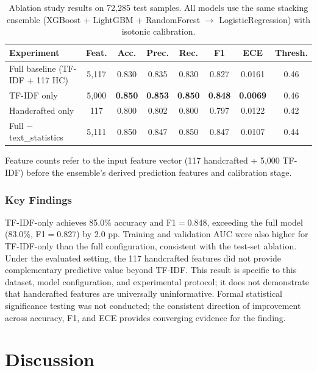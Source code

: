 \documentclass[12pt,a4paper]{article}
\begin{document}
\begin{table}[H]
\centering
\caption{Ablation study results on 72,285 test samples. All models use the same stacking ensemble (XGBoost + LightGBM + RandomForest $\to$ LogisticRegression) with isotonic calibration.}
\label{tab:ablation}
\small
\begin{tabular}{@{}lccccccc@{}}
\toprule
\textbf{Experiment} & \textbf{Feat.} & \textbf{Acc.} & \textbf{Prec.} & \textbf{Rec.} & \textbf{F1} & \textbf{ECE} & \textbf{Thresh.} \\
\midrule
Full baseline (TF-IDF + 117 HC) & 5,117 & 0.830 & 0.835 & 0.830 & 0.827 & 0.0161 & 0.46 \\
TF-IDF only & 5,000 & \textbf{0.850} & \textbf{0.853} & \textbf{0.850} & \textbf{0.848} & \textbf{0.0069} & 0.46 \\
Handcrafted only & 117 & 0.800 & 0.802 & 0.800 & 0.797 & 0.0122 & 0.42 \\
Full $-$ text\_statistics & 5,111 & 0.850 & 0.847 & 0.850 & 0.847 & 0.0107 & 0.44 \\
\bottomrule
\end{tabular}
\medskip
\footnotesize{Feature counts refer to the input feature vector (117 handcrafted + 5,000 TF-IDF) before the ensemble's derived prediction features and calibration stage.}
\end{table}

\subsubsection{Key Findings}

TF-IDF-only achieves 85.0\% accuracy and F1$=$0.848, exceeding the full model (83.0\%, F1$=$0.827) by 2.0 pp. Training and validation AUC were also higher for TF-IDF-only than the full configuration, consistent with the test-set ablation. Under the evaluated setting, the 117 handcrafted features did not provide complementary predictive value beyond TF-IDF. This result is specific to this dataset, model configuration, and experimental protocol; it does not demonstrate that handcrafted features are universally uninformative. Formal statistical significance testing was not conducted; the consistent direction of improvement across accuracy, F1, and ECE provides converging evidence for the finding.

\section{Discussion}\label{sec:discussion}
\end{document}
